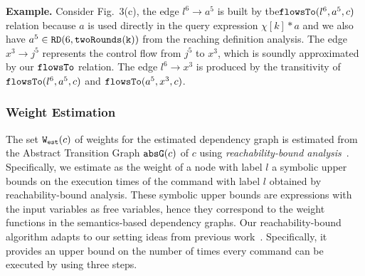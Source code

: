 \textbf{Example.}
Consider Fig.~3(c),  
the edge $l^6 \to a^5$ is built by tbe$\mathtt{flowsTo}(l^6, a^5, c)$ relation because
$a$ is used directly in the query expression $\chi[k]*a$
and we also have $a^5 \in \mathtt{RD}(6, \mathtt{twoRounds(k)})$ from the reaching definition analysis.
The edge $x^3 \to j^5$  represents the control flow from $j^5$ to $x^3$, which is soundly approximated by our $\mathtt{flowsTo}$ relation.
The edge $l^6 \to x^3$ is produced by the transitivity of $\mathtt{flowsTo}(l^6, a^5, c)$ and $\mathtt{flowsTo}(a^5, x^3, c)$. 

\subsubsection{Weight Estimation}
\label{sec:alg_weightgen}
The set $\mathtt{{W_{est}}}(c)$ of weights for the estimated dependency graph is estimated from the Abstract Transition Graph $\mathtt{abs}{\mathtt{G}}(c)$ of $c$ using \emph{reachability-bound analysis}~\cite{GulwaniZ10}. Specifically, we estimate as the weight of a node with label $l$ a symbolic upper bounds on the execution times of the command with label $l$ obtained by reachability-bound analysis. These symbolic upper bounds are expressions with the input variables as free variables, hence they correspond to the weight functions in the semantics-based dependency graphs. 
Our reachability-bound algorithm adapts to our setting ideas from previous work~\cite{ZulegerGSV11,SinnZV14,sinn2017complexity}.
Specifically, it provides an upper bound on the number of times every command can be executed by using three steps.
